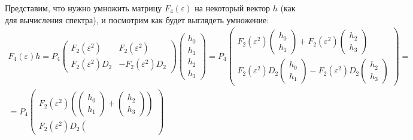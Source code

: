Представим, что нужно умножить матрицу $F_4(\varepsilon)$ на некоторый вектор $h$ (как для вычисления спектра), и посмотрим как будет выглядеть умножение:
\begin{multline*}
    F_4(\varepsilon) h
    = P_4
    \begin{pmatrix}
        F_2(\varepsilon^2)     & F_2(\varepsilon^2)       \\
        F_2(\varepsilon^2) D_2 & - F_2(\varepsilon^2) D_2
    \end{pmatrix}
    \begin{pmatrix}
        h_0 \\
        h_1 \\
        h_2 \\
        h_3
    \end{pmatrix}
    = P_4
    \begin{pmatrix}
        F_2(\varepsilon^2)
        \begin{pmatrix}
            h_0 \\
            h_1
        \end{pmatrix}
        +
        F_2(\varepsilon^2)
        \begin{pmatrix}
            h_2 \\
            h_3
        \end{pmatrix} \\
        F_2(\varepsilon^2) D_2
        \begin{pmatrix}
            h_0 \\
            h_1
        \end{pmatrix}
        - F_2(\varepsilon^2) D_2
        \begin{pmatrix}
            h_2 \\
            h_3
        \end{pmatrix}
    \end{pmatrix}
    = \\
%
    = P_4
    \begin{pmatrix}
        F_2(\varepsilon^2)
        \left(
        \begin{pmatrix}
            h_0 \\
            h_1
        \end{pmatrix}
        +
        \begin{pmatrix}
            h_2 \\
            h_3
        \end{pmatrix}
        \right) \\
        F_2(\varepsilon^2) D_2
        \left(

\end{pmatrix}
\end{multline*}
